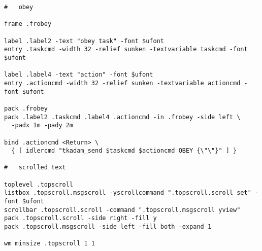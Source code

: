 \begin{verbatim}
#   obey

frame .frobey 

label .label2 -text "obey task" -font $ufont
entry .taskcmd -width 32 -relief sunken -textvariable taskcmd -font $ufont

label .label4 -text "action" -font $ufont
entry .actioncmd -width 32 -relief sunken -textvariable actioncmd -font $ufont

pack .frobey
pack .label2 .taskcmd .label4 .actioncmd -in .frobey -side left \
  -padx 1m -pady 2m

bind .actioncmd <Return> \
  { [ idlercmd "tkadam_send $taskcmd $actioncmd OBEY {\"\"}" ] }

#   scrolled text

toplevel .topscroll 
listbox .topscroll.msgscroll -yscrollcommand ".topscroll.scroll set" -font $ufont
scrollbar .topscroll.scroll -command ".topscroll.msgscroll yview"
pack .topscroll.scroll -side right -fill y 
pack .topscroll.msgscroll -side left -fill both -expand 1 

wm minsize .topscroll 1 1


\end{verbatim}




